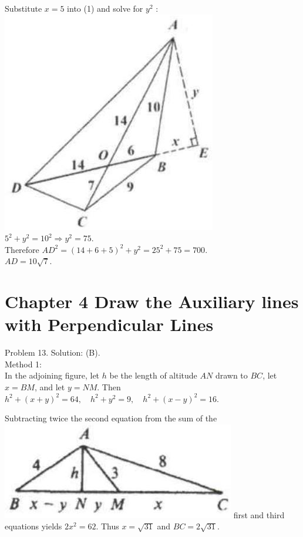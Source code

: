 \documentclass[10pt]{article}
\begin{document}
Substitute \(x=5\) into (1) and solve for \(y^{2}\) :\\
\includegraphics[max width=\textwidth, center]{2025_04_17_97bc1f7e44d93c271a88g-096(1)}\\
\(5^{2}+y^{2}=10^{2} \Rightarrow y^{2}=75\).\\
Therefore \(A D^{2}=(14+6+5)^{2}+y^{2}=25^{2}+75=700\).\\
\(A D=10 \sqrt{7}\).

\section*{Chapter 4 Draw the Auxiliary lines with Perpendicular Lines}
Problem 13. Solution: (B).\\
Method 1:\\
In the adjoining figure, let \(h\) be the length of altitude \(A N\) drawn to \(B C\), let \(x=B M\), and let \(y=N M\). Then\\
\(h^{2}+(x+y)^{2}=64, \quad h^{2}+y^{2}=9, \quad h^{2}+(x-y)^{2}=16\).

Subtracting twice the second equation from the sum of the\\
\includegraphics[max width=\textwidth]{2025_04_17_97bc1f7e44d93c271a88g-097(1)} first and third equations yields \(2 x^{2}=62\). Thus \(x=\sqrt{31}\) and \(B C=2 \sqrt{31}\).
\end{document}
